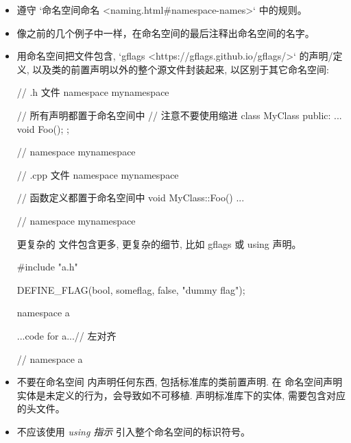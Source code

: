 \begin{itemize}
  \item 遵守 `命名空间命名 <naming.html#namespace-names>` 中的规则。
  \item 像之前的几个例子中一样，在命名空间的最后注释出命名空间的名字。
  \item 用命名空间把文件包含, `gflags <https://gflags.github.io/gflags/>` 的声明/定义, 以及类的前置声明以外的整个源文件封装起来, 以区别于其它命名空间:

\begin{cppcode}
  // .h 文件
namespace mynamespace {

// 所有声明都置于命名空间中
// 注意不要使用缩进
class MyClass {
public:
...
void Foo();
};

} // namespace mynamespace
\end{cppcode}

\begin{cppcode}
// .cpp 文件
namespace mynamespace {

// 函数定义都置于命名空间中
void MyClass::Foo() {
...
}

} // namespace mynamespace
\end{cppcode}

        更复杂的  文件包含更多, 更复杂的细节, 比如 gflags 或 using 声明。

\begin{cppcode}
#include "a.h"

DEFINE_FLAG(bool, someflag, false, "dummy flag");

namespace a {

...code for a...// 左对齐

} // namespace a
\end{cppcode}

  \item 不要在命名空间  内声明任何东西, 包括标准库的类前置声明. 在  命名空间声明实体是未定义的行为，会导致如不可移植. 声明标准库下的实体, 需要包含对应的头文件。

  \item 不应该使用 \textit{using 指示} 引入整个命名空间的标识符号。


\end{itemize}
